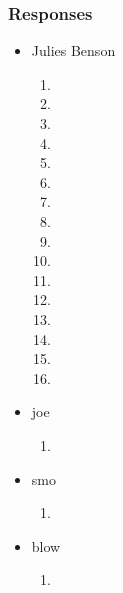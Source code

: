 \documentclass[titlepage]{article}
\begin{document}
            \subsubsection{Responses}
                \begin{itemize}
                    \item Julies Benson
                        \begin{enumerate}
                            \item 
                            \item 
                            \item 
                            \item 
                            \item 
                            \item 
                            \item 
                            \item 
                            \item 
                            \item 
                            \item 
                            \item 
                            \item 
                            \item 
                            \item 
                            \item 
                        \end{enumerate}
                    \item joe
                        \begin{enumerate}
                            \item 
                        \end{enumerate}
                    \item smo
                        \begin{enumerate}
                            \item 
                        \end{enumerate}
                    \item blow
                        \begin{enumerate}
                            \item 
                        \end{enumerate}

\end{itemize}
\end{document}
